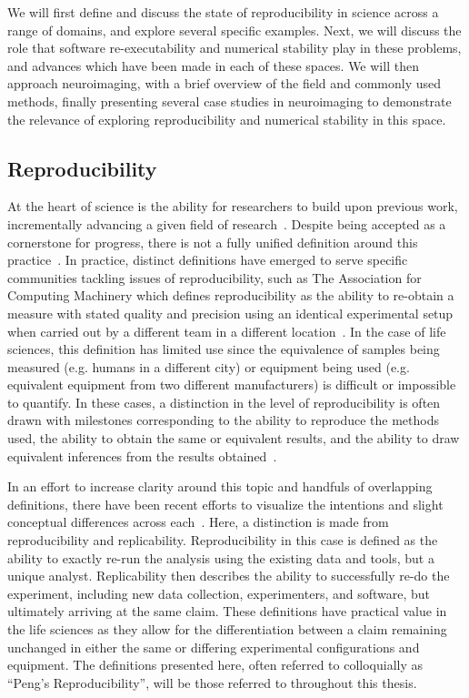 We will first define and discuss the state of reproducibility in science across a range of domains, and explore several
specific examples. Next, we will discuss the role that software re-executability and numerical stability play in these
problems, and advances which have been made in each of these spaces. We will then approach neuroimaging, with a brief
overview of the field and commonly used methods, finally presenting several case studies in neuroimaging to demonstrate
the relevance of exploring reproducibility and numerical stability in this space.

\subsection{Reproducibility}
At the heart of science is the ability for researchers to build upon previous work, incrementally advancing a given
field of research~\cite{salmon1999introduction,platt1964strong}. Despite being accepted as a cornerstone for progress,
there is not a fully unified definition around this
practice~\cite{plesser2018reproducibility,patil2019visual,goodman2016does}. In practice, distinct definitions have
emerged to serve specific communities tackling issues of reproducibility, such as The Association for Computing
Machinery which defines reproducibility as the ability to re-obtain a measure with stated quality and precision using
an identical experimental setup when carried out by a different team in a different location~\cite{acm_2020}. In the
case of life sciences, this definition has limited use since the equivalence of samples being measured (e.g. humans in
a different city) or equipment being used (e.g. equivalent equipment from two different manufacturers) is difficult or
impossible to quantify. In these cases, a distinction in the level of reproducibility is often drawn with milestones
corresponding to the ability to reproduce the methods used, the ability to obtain the same or equivalent results, and
the ability to draw equivalent inferences from the results obtained~\cite{plesser2018reproducibility}.

In an effort to increase clarity around this topic and handfuls of overlapping definitions, there have been recent
efforts to visualize the intentions and slight conceptual differences across each~\cite{patil2019visual}. Here, a
distinction is made from reproducibility and replicability. Reproducibility in this case is defined as the ability to
exactly re-run the analysis using the existing data and tools, but a unique analyst. Replicability then describes the
ability to successfully re-do the experiment, including new data collection, experimenters, and software, but
ultimately arriving at the same claim. These definitions have practical value in the life sciences as they allow for
the differentiation between a claim remaining unchanged in either the same or differing experimental configurations and
equipment. The definitions presented here, often referred to colloquially as ``Peng's Reproducibility'', will be those
referred to throughout this thesis.

